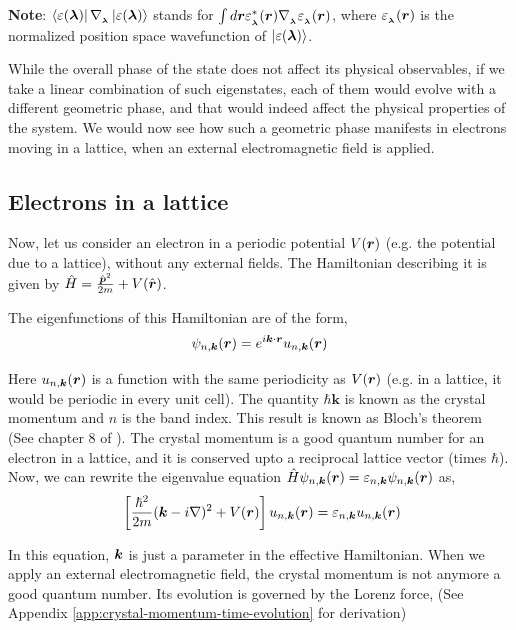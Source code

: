 \documentclass{revtex4-2}
\newcommand{\bvec}[1]{{\mathbf #1}}
\renewcommand\vec[1]{\ensuremath\boldsymbol{#1}} %
\begin{document}
\textbf{Note}: $\bra{\varepsilon({\vec{\lambda}})}\nabla_{_{\vec{\lambda}}} \ket{\varepsilon({\vec{\lambda}})}$ stands for $\int d\vec{r} \varepsilon_{_{\vec{\lambda}}}^* (\vec{r}) \nabla_{_{\vec{\lambda}}} \varepsilon_{_{\vec{\lambda}}}(\vec{r})$, where $\varepsilon_{_{\vec{\lambda}}}(\vec{r})$ is the normalized position space wavefunction of $\ket{\varepsilon({\vec{\lambda}})}$.

While the overall phase of the state does not affect its physical observables, if we take a linear combination of such eigenstates, each of them would evolve with a different geometric phase, and that would indeed affect the physical properties of the system. We would now see how such a geometric phase manifests in electrons moving in a lattice, when an external electromagnetic field is applied.

\subsection{Electrons in a lattice}
Now, let us consider an electron in a periodic potential $V(\vec{r})$ (e.g. the potential due to a lattice), without any external fields. The Hamiltonian describing it is given by $\hat{H} = \frac{{\hat{\vec{p}}}^2}{2 m} + V(\hat{\vec{r}})$.

The eigenfunctions of this Hamiltonian are of the form,
$$\psi_{n, \vec{k}} (\vec{r}) = e^{i \vec{k}\cdot \vec{r}} u_{n,\vec{k}} (\vec{r})$$

Here $u_{n,\vec{k}} (\vec{r})$ is a function with the same periodicity as $V(\vec{r})$ (e.g. in a lattice, it would be periodic in every unit cell). The quantity $\hbar \bvec{k}$ is known as the crystal momentum and $n$ is the band index. This result is known as Bloch's theorem (See chapter 8 of \cite{AshcroftMermin76}). The crystal momentum is a good quantum number for an electron in a lattice, and it is conserved upto a reciprocal lattice vector (times $\hbar$).
Now, we can rewrite the eigenvalue equation $\hat{H} \psi_{n, \vec{k}}(\vec{r}) = \varepsilon_{n,\vec{k}} \psi_{n, \vec{k}}(\vec{r})$ as,
\begin{equation}~\label{Eq:effectiveBlochEquation}
	\left[\frac{\hbar^2}{2m}(\vec{k} - i \nabla)^2 + V(\vec{r}) \right]u_{n,\vec{k}} (\vec{r}) = \varepsilon_{n,\vec{k}} u_{n,\vec{k}} (\vec{r})
\end{equation}

In this equation, $\vec{k}$ is just a parameter in the effective Hamiltonian. When we apply an external electromagnetic field, the crystal momentum is not anymore a good quantum number. Its evolution is governed by the Lorenz force, (See Appendix \ref{app:crystal-momentum-time-evolution} for derivation)
\end{document}
